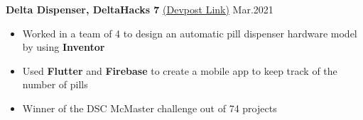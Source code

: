 \documentclass[a4paper]{article}
\begin{document}
\vspace*{-1mm}

{\textbf{Delta Dispenser, DeltaHacks 7}} \href{https://devpost.com/software/pill-dispenser-reminder-2000}{(Devpost Link)}
\hfill{Mar.2021}\\
\vspace{-2mm}
 \begin{itemize} \itemsep -2pt
    \item{Worked in a team of 4 to design an automatic pill dispenser hardware model by using \textbf{Inventor}}
    \item{Used \textbf{Flutter} and \textbf{Firebase} to create a mobile app to keep track of the number of pills}
    \item{Winner of the DSC McMaster challenge out of 74 projects}
\end{itemize}
\vspace*{0mm}
\end{document}
